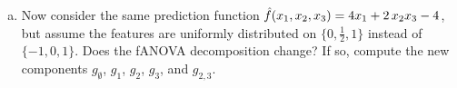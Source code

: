 {\begin{enumerate}[a)]
        \textit{Hint:} Most of the fANOVA components are 0 in this example, which means that you only need to check the orthogonality condition for the remaining nonzero components.

  \item Now consider the same prediction function $\hat{f}(x_1,x_2,x_3) = 4x_1 + 2\,x_2x_3 - 4$, but assume the features are uniformly distributed on $\{0, \tfrac12, 1\}$ instead of $\{-1,0,1\}$.
        Does the fANOVA decomposition change? If so, compute the new components $g_\emptyset$, $g_1$, $g_2$, $g_3$, and $g_{2,3}$.
\end{enumerate}

}